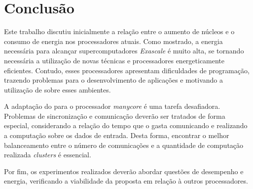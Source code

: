 \chapter{Conclusão}
\label{cha:conclusao}
Este trabalho discutiu inicialmente a relação entre o aumento de núcleos e o consumo de
energia nos processadores atuais. Como mostrado, a energia necessária para alcançar supercomputadores
\textit{Exascale} é muito alta, se tornando necessária a utilização de
novas técnicas e processadores energeticamente eficientes. Contudo, esses
processadores apresentam dificuldades de programação, trazendo problemas para o desenvolvimento
de aplicações e motivando a utilização de \fws sobre esses ambientes.

A adaptação do \fw para o processador \textit{manycore} \mppa é uma
tarefa desafiadora. Problemas de sincronização e comunicação deverão ser
tratados de forma especial, considerando a relação do tempo que o \fw gasta
comunicando e realizando a computação sobre os dados de entrada. Desta forma,
encontrar o melhor balanceamento entre o número de comunicações e a
quantidade de computação realizada \textit{clusters} é essencial.

Por fim, os experimentos realizados deverão abordar questões de desempenho e
energia, verificando a viabilidade da proposta em relação à outros
processadores.
